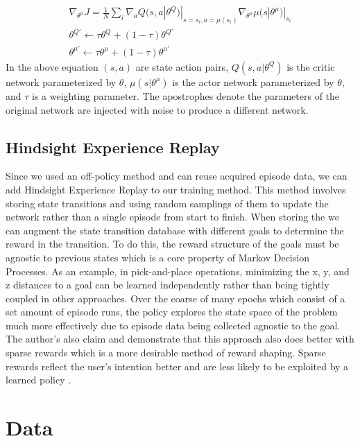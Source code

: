 \documentclass[conference]{IEEEtran}
\begin{document}
\begin{gather}
    \nabla_{\theta^\mu}J=\frac{1}{N}\sum_{i}\nabla_a Q(s,a|\theta^Q)|_{s=s_i,a=\mu(s_i)} \nabla_{\theta^\mu}\mu(s|\theta^\mu)|_{s_i} \\
    \theta^{Q'} \leftarrow \tau \theta^Q+(1-\tau)\theta^{Q'}\\
    \theta^{\mu'} \leftarrow \tau \theta^{\mu}+(1-\tau)\theta^{\mu'}
\end{gather}
In the above equation $(s,a)$ are state action pairs, $Q(s,a|\theta^Q)$ is the critic network parameterized by $\theta$, $\mu(s|\theta^{\mu})$ is the actor network parameterized by $\theta$, and $\tau$ is a weighting parameter. The apostrophes denote the parameters of the original network are injected with noise to produce a different network.

\subsection{Hindsight Experience Replay}

Since we used an off-policy method and can reuse acquired episode data, we can add Hindsight Experience Replay \cite{andrychowicz2017hindsight} to our training method. This method involves storing state transitions and using random samplings of them to update the network rather than a single episode from start to finish. When storing the we can augment the state transition database with different goals to determine the reward in the transition. To do this, the reward structure of the goals must be agnostic to previous states which is a core property of Markov Decision Processes. As an example, in pick-and-place operations, minimizing the x, y, and z distances to a goal can be learned independently rather than being tightly coupled in other approaches. Over the coarse of many epochs which consist of a set amount of episode runs, the policy explores the state space of the problem much more effectively due to episode data being collected agnostic to the goal. The author's also claim and demonstrate that this approach also does better with sparse rewards which is a more desirable method of reward shaping. Sparse rewards reflect the user's intention better and are less likely to be exploited by a learned policy \cite{andrychowicz2017hindsight}.

\section{Data}\label{sec:data}
\end{document}
